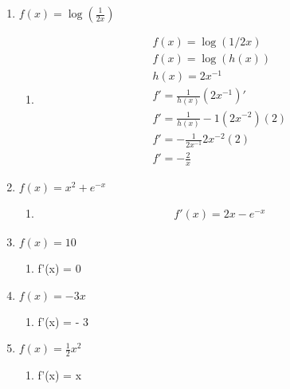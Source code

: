 \documentclass[krantz1,ChapterTOCs]{krantz}
\begin{document}
\begin{enumerate}
\begin{enumerate}
\begin{enumerate}
        \item $f(x) = \log(\frac{1}{2x})$
        \begin{enumerate}
            \item  {\color{red}
            \begin{align}
                f(x) = \log(1/2x) \\ 
                f(x) = \log(h(x)) \\ 
                h(x) = 2x^{-1} \\
                f' = \frac{1}{h(x)} (2x^{-1})' \\
                f' = \frac{1}{h(x)} -1 (2x^{-2}) (2) \\
                f' = -\frac{1}{2x^{-1}} 2x^{-2} (2) \\
                f' = -\frac{2}{x} 
            \end{align}
            }
        \end{enumerate}
        
        \item $f(x) = x^{2} + e^{-x}$
        \begin{enumerate}
            \item  {\color{red} 
            \begin{align}
                f'(x) = 2x - e^{-x}
            \end{align}
            
            }
        \end{enumerate}
        
        \item $f(x) = 10$
        \begin{enumerate}
            \item  {\color{red} f'(x) = 0   }
        \end{enumerate}
        
        \item $f(x) = -3x$
        \begin{enumerate}
            \item  {\color{red}    f'(x) = - 3}
        \end{enumerate}
        
        \item $f(x) = \frac{1}{2}x^{2}$
        \begin{enumerate}
            \item  {\color{red}
                f'(x) = x
            }
        \end{enumerate}
        

\end{enumerate}
\end{enumerate}
\end{enumerate}
\end{document}
